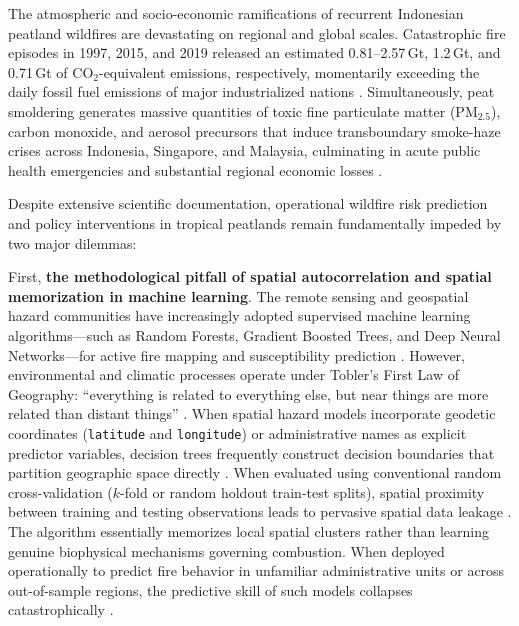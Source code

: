 The atmospheric and socio-economic ramifications of recurrent Indonesian peatland wildfires are devastating on regional and global scales. Catastrophic fire episodes in 1997, 2015, and 2019 released an estimated 0.81--2.57\,Gt, 1.2\,Gt, and 0.71\,Gt of $\text{CO}_2$-equivalent emissions, respectively, momentarily exceeding the daily fossil fuel emissions of major industrialized nations \citep{Page2002Nature, Field2016PNAS, VanderWerf2017ESSD}. Simultaneously, peat smoldering generates massive quantities of toxic fine particulate matter ($\text{PM}_{2.5}$), carbon monoxide, and aerosol precursors that induce transboundary smoke-haze crises across Indonesia, Singapore, and Malaysia, culminating in acute public health emergencies and substantial regional economic losses \citep{Gaveau2014PLOSONE, Kiely2021ACP, Graham2022SciRep}.

Despite extensive scientific documentation, operational wildfire risk prediction and policy interventions in tropical peatlands remain fundamentally impeded by two major dilemmas:

First, \textbf{the methodological pitfall of spatial autocorrelation and spatial memorization in machine learning}. The remote sensing and geospatial hazard communities have increasingly adopted supervised machine learning algorithms---such as Random Forests, Gradient Boosted Trees, and Deep Neural Networks---for active fire mapping and susceptibility prediction \citep{Breiman2001ML}. However, environmental and climatic processes operate under Tobler's First Law of Geography: ``everything is related to everything else, but near things are more related than distant things'' \citep{Tobler1970EconGeogr, Legendre1993Ecology}. When spatial hazard models incorporate geodetic coordinates (\texttt{latitude} and \texttt{longitude}) or administrative names as explicit predictor variables, decision trees frequently construct decision boundaries that partition geographic space directly \citep{Meyer2018EcolModel, Dormann2007Ecography}. When evaluated using conventional random cross-validation ($k$-fold or random holdout train-test splits), spatial proximity between training and testing observations leads to pervasive spatial data leakage \citep{Roberts2017Ecography, Wadoux2021EcolModel}. The algorithm essentially memorizes local spatial clusters rather than learning genuine biophysical mechanisms governing combustion. When deployed operationally to predict fire behavior in unfamiliar administrative units or across out-of-sample regions, the predictive skill of such models collapses catastrophically \citep{Meyer2018EcolModel, Schratz2019EcolModel, MeyerPebesma2021NatComm}.

